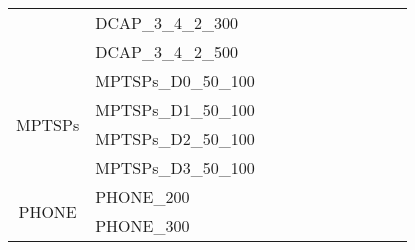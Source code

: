 \begin{table}[]
{\begin{tabular}{|c|l|lll|lll|l|l|l|}
			& DCAP\_3\_4\_2\_300            &                                   &                                 &             &                           &                         &      &                                         &                                 &                                \\
			& DCAP\_3\_4\_2\_500            &                                   &                                 &             &                           &                         &      &                                         &                                 &                                \\ \hline
			\multirow{4}{*}{MPTSPs}  & MPTSPs\_D0\_50\_100           &                                   &                                 &             &                           &                         &      &                                         &                                 &                                \\
			& MPTSPs\_D1\_50\_100           &                                   &                                 &             &                           &                         &      &                                         &                                 &                                \\
			& MPTSPs\_D2\_50\_100           &                                   &                                 &             &                           &                         &      &                                         &                                 &                                \\
			& MPTSPs\_D3\_50\_100           &                                   &                                 &             &                           &                         &      &                                         &                                 &                                \\ \hline
			\multirow{4}{*}{PHONE}   & PHONE\_200                    &                                   &                                 &             &                           &                         &      &                                         &                                 &                                \\
			& PHONE\_300                    &                                   &                                 &             &                           &                         &      &                                         &                                 &                                \\

\end{tabular}}
\end{table}
